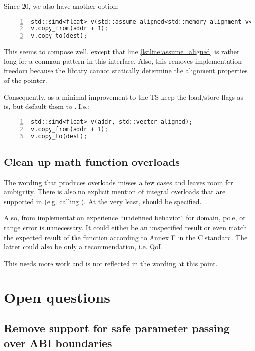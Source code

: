 Since \CC{}20, we also have another option:
\medskip\begin{lstlisting}[numbers=left]
std::simd<float> v(std::assume_aligned<std::memory_alignment_v<std::simd<float>>>(addr)); @\label{lstline:assume_aligned}@
v.copy_from(addr + 1);
v.copy_to(dest);
\end{lstlisting}
This seems to compose well, except that line \ref{lstline:assume_aligned} is rather long for a common pattern in this interface.
Also, this removes implementation freedom because the library cannot statically determine the alignment properties of the pointer.

Consequently, as a minimal improvement to the TS keep the load/store flags as
is, but default them to .
I.e.:
\medskip\begin{lstlisting}[numbers=left]
std::simd<float> v(addr, std::vector_aligned);
v.copy_from(addr + 1);
v.copy_to(dest);
\end{lstlisting}

\subsection{Clean up math function overloads}
The wording that produces  overloads misses a few cases and leaves room for ambiguity.
There is also no explicit mention of integral overloads that are supported in  (e.g.  calling ).
At the very least,  should be specified.

Also, from implementation experience ``undefined behavior'' for domain, pole, or range error is unnecessary.
It could either be an unspecified result or even match the expected result of the function according to Annex F in the C standard.
The latter could also be only a recommendation, i.e. QoI.

This needs more work and is not reflected in the wording at this point.


\section{Open questions}

\subsection{Remove support for safe parameter passing over ABI boundaries}
\label{sec:noabihelper}


